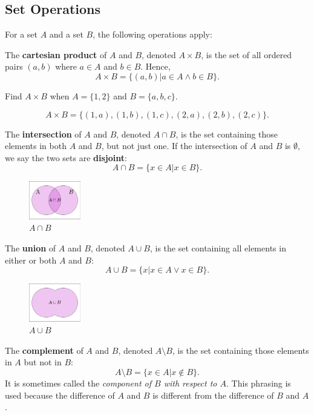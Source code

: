 \subsection{Set Operations}

For a set $A$ and a set $B$, the following operations apply:

The \textbf{cartesian product} of $A$ and $B$, denoted $A \times B$, is the set of
all ordered pairs $(a, b)$ where $a \in A$ and $b \in B$. Hence,
\[ A \times B = \big\{ (a,b) | a \in A \land b \in B \big\}. \]

\begin{ex}
  Find $A \times B$ when $A = \{ 1,2 \} $ and $B = \{ a, b, c\} $.
  \begin{sol}
    \[A \times B = \big\{(1,a),(1,b),(1,c),
    (2,a),(2,b),(2,c)\big\}.\]
  \end{sol}
\end{ex}

The \textbf{intersection} of $A$ and $B$, denoted 
$A \cap B$,
is the set containing those elements in both $A$ and $B$, but not just one.
If the intersection of $A$ and $B$ is $\emptyset$, we say the two sets are 
\textbf{disjoint}:
\[ A \cap B = \big\{ x \in A | x \in B \big\}.\]
\begin{figure}[H]
  \begin{center}
    \includegraphics[width=0.2\textwidth]{discrete/sets/intersection.eps}
  \end{center}
  \caption{$A\cap B$}
\end{figure}The \textbf{union} of $A$ and $B$, denoted $A \cup B$,
is the set containing all elements in either or both $A$ and $B$:
\[ A \cup B = \big\{ x | x \in A \lor x \in B \big\}.\]
\begin{figure}[H]
  \begin{center}
    \includegraphics[width=0.2\textwidth]{discrete/sets/union.eps}
  \end{center}
  \caption{$A \cup B$}
\end{figure}
The \textbf{complement} of $A$ and $B$, denoted $A \setminus B$,
is the set containing those elements in $A$ but not in $B$:
\[ A \setminus B = \big\{ x \in A \big| x \not\in B \big\}. \]
It is sometimes called the \emph{component of $B$ with respect to $A$}.
This phrasing is used because the difference of $A$ and $B$ is different from the 
difference of $B$ and $A$.

